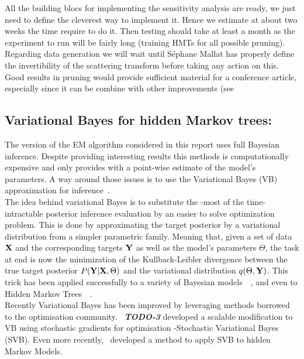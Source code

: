 \documentclass[a4paper,11pt]{report}
\begin{document}
    All the building blocs for implementing the sensitivity analysis are ready, we just need to define the cleverest way to implement it. Hence we estimate at about two weeks the time require to do it. Then testing should take at least a month as the experiment to run will be fairly long (training HMTs for all possible pruning). Regarding data generation we will wait until S\'ephane Mallat has properly define the invertibility of the scattering transform before taking any action on this. Good results in pruning would provide sufficient material for a conference article, especially since it can be combine with other improvements (see 
		   
  \subsection{Variational Bayes for hidden Markov trees:}

    The version of the EM algorithm considered in this report uses full Bayesian inference. Despite providing interesting results this methods is computationally expensive and only provides with a point-wise estimate of the model's parameters. A way around those issues is to use the Variational Bayes (VB) approximation for inference~\cite{wainwright2008graphical}.\\
    
    The idea behind variational Bayes is to substitute the -most of the time- intractable posterior inference evaluation by an easier to solve optimization problem. This is done by approximating the target posterior by a variational distribution from a simpler parametric family. Meaning that, given a set of data ${\bf X}$ and the corresponding targets ${\bf Y}$ as well as the model's parameters $\Theta$, the task at end is now the minimization of the Kullback-Leibler divergence between the true target posterior $P({\bf Y} | {\bf X}, \Theta)$ and the variational distribution $q(\Theta, {\bf Y})$. This trick has been applied successfully to a variety of Bayesian models~\citep{attias2000variational}~\citep{wainwright2008graphical}, and even to Hidden Markov Trees~\citep{dasgupta2006texture}~\citep{olariu2009modified}.\\

    Recently Variational Bayes has been improved by leveraging methods borrowed to the optimisation community. ~\textbf{\textit{TODO-3}} developed a scalable modification to VB using stochastic gradients for optimisation -Stochastic Variational Bayes (SVB). Even more recently,~\citep{NIPS2014_5560} developed a method to apply SVB to hidden Markov Models. \\
\end{document}
